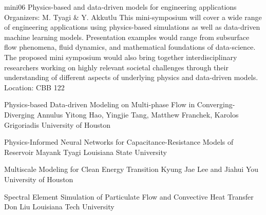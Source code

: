 \mini
{mini06}
{Physics-based and data-driven models for engineering applications}
{Organizers: M. Tyagi \& Y. Akkutlu}
{This mini-symposium will cover a wide range of engineering applications using physics-based simulations as well as data-driven machine learning models. Presentation examples would range from subsurface flow phenomena, fluid dynamics, and mathematical foundations of data-science. The proposed mini symposium would also bring together interdisciplinary researchers working on highly relevant societal challenges through their understanding of different aspects of underlying physics and data-driven models.}
{Location: CBB 122}

\begin{talks}
\item\talk
{Physics-based Data-driven Modeling on Multi-phase Flow in Converging-Diverging Annulus}
{Yitong Hao, Yingjie Tang, Matthew Franchek, Karolos Grigoriadis}
{University of Houston}
\item\talk
{Physics-Informed Neural Networks for Capacitance-Resistance Models of Reservoir}
{Mayank Tyagi}
{Louisiana State University}
\item\talk
{Multiscale Modeling for Clean Energy Transition}
{Kyung Jae Lee and Jiahui You}
{University of Houston}
\item\talk
{Spectral Element Simulation of Particulate Flow and Convective Heat Transfer}
{Don Liu}
{Louisiana Tech University}
\end{talks}
\room
